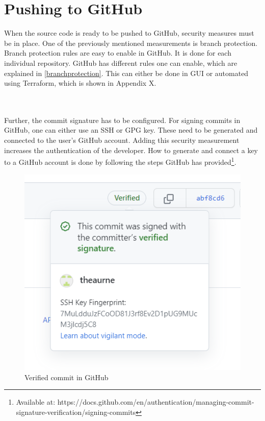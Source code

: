 \section{Pushing to GitHub}
When the source code is ready to be pushed to GitHub, security measures must be in place. One of the previously mentioned measurements is branch protection. Branch protection rules are easy to enable in GitHub. It is done for each individual repository. GitHub has different rules one can enable, which are explained in \ref{branchprotection}. This can either be done in \gls{GUI} or automated using Terraform, which is shown in Appendix X. 

\\~\\
Further, the commit signature has to be configured. For signing commits in GitHub, one can either use an SSH or GPG key. These need to be generated and connected to the user's GitHub account. Adding this security measurement increases the authentication of the developer. How to generate and connect a key to a GitHub account is done by following the steps GitHub has provided\footnote{Available at: https://docs.github.com/en/authentication/managing-commit-signature-verification/signing-commits}.

\begin{figure}[H]
    \centering
    \includegraphics{Images/verified-commit.png}
    \caption{Verified commit in GitHub}
    \label{fig:verified-commit}
\end{figure}

